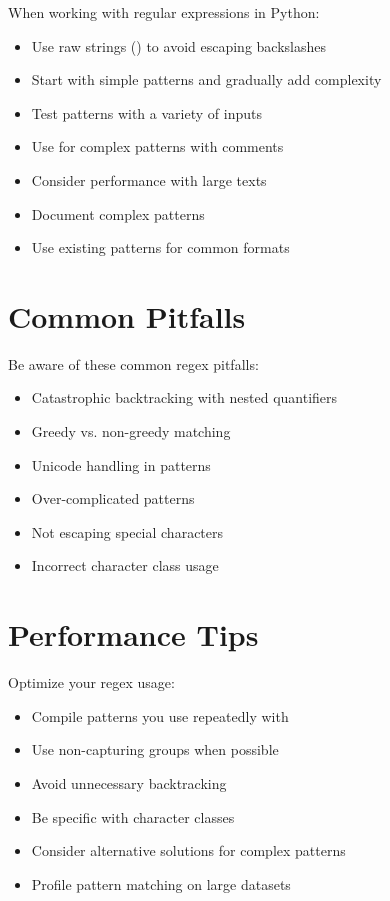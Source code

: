 When working with regular expressions in Python:

\begin{itemize}
    \item Use raw strings () to avoid escaping backslashes
    \item Start with simple patterns and gradually add complexity
    \item Test patterns with a variety of inputs
    \item Use  for complex patterns with comments
    \item Consider performance with large texts
    \item Document complex patterns
    \item Use existing patterns for common formats
\end{itemize}

\section{Common Pitfalls}

Be aware of these common regex pitfalls:

\begin{itemize}
    \item Catastrophic backtracking with nested quantifiers
    \item Greedy vs. non-greedy matching
    \item Unicode handling in patterns
    \item Over-complicated patterns
    \item Not escaping special characters
    \item Incorrect character class usage
\end{itemize}

\section{Performance Tips}

Optimize your regex usage:

\begin{itemize}
    \item Compile patterns you use repeatedly with 
    \item Use non-capturing groups  when possible
    \item Avoid unnecessary backtracking
    \item Be specific with character classes
    \item Consider alternative solutions for complex patterns
    \item Profile pattern matching on large datasets
\end{itemize}

